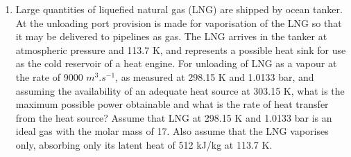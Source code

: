 \documentclass[12pts,a4paper,amsmath,amssymb,floatfix]{article}%
\begin{document}
\begin{enumerate}[label=\bfseries Problem \arabic*:]
\item\label{Tut02:LNG} Large quantities of liquefied natural gas (LNG) are shipped by ocean tanker. At the unloading port provision is made for vaporisation of the LNG so that it may be delivered to pipelines as gas. The LNG arrives in the tanker at atmospheric pressure and 113.7 K, and represents a possible heat sink for use as the cold reservoir of a heat engine. For unloading of LNG as a vapour at the rate of 9000 $m^{3}.s^{-1}$, as measured at 298.15 K and 1.0133 bar, and assuming the availability of an adequate heat source at 303.15 K, what is the maximum possible power obtainable and what is the rate of heat transfer from the heat source? Assume that LNG at 298.15 K and 1.0133 bar is an ideal gas with the molar mass of 17. Also assume that the LNG vaporises only, absorbing only its latent heat of 512 kJ/kg at 113.7 K.

\begin{comment}
\item Given saturated ammonia vapour at $P_{1} = 200 kPa$ compressed by a piston to $P_{2} = 1.6 MPa$ in a reversible adiabatic process, (a) find the work done per unit mass; (b) sketch the T-s and P-v diagrams. Given:
\begin{center}
\begin{tabular}{||c|c|c c|c c|c c|c c||} 
\hline\hline
$T$ & $P_{sat}$ & $v_{f}$ &  $v_{g}$ & $u_{f}$ & $u_{g}$ &  $h_{f}$ &  $h_{g}$ & $s_{f}$ & $s_{g}$ \\ 
\hline
-20 & 190.2 & 1.504$\times$10$^{-3}$ & 0.62334 & 88.76 & 1299.5 & 89.05 & 1418.0 & 0.3657 & 5.6155 \\
\hline
-15 & 236.3 & 1.519$\times$10$^{-3}$ & 0.50838 & 111.3 & 1304.5 & 111.66 & 1424.6 & 0.4538 & 5.5397 \\ 
\hline\hline
\end{tabular}
\end{center}

with
[$T$]= $^{o}$C; [$P$]= kPa; [$v$]=$\frac{m^{3}}{kg}$; [$u$] = [$h$] = $\frac{kJ}{kg}$, [$s$] = $\frac{kJ}{kg.K}$ 
\end{comment}




\end{enumerate}
\end{document}
